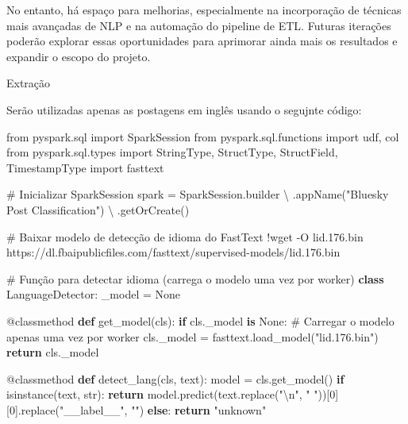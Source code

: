 \documentclass[
  letterpaper,
  DIV=11,
  numbers=noendperiod]{scrartcl}
\newenvironment{Shaded}{\begin{snugshade}}{\end{snugshade}}
\newcommand{\AttributeTok}[1]{\textcolor[rgb]{0.40,0.45,0.13}{#1}}
\newcommand{\BuiltInTok}[1]{\textcolor[rgb]{0.00,0.23,0.31}{#1}}
\newcommand{\CharTok}[1]{\textcolor[rgb]{0.13,0.47,0.30}{#1}}
\newcommand{\CommentTok}[1]{\textcolor[rgb]{0.37,0.37,0.37}{#1}}
\newcommand{\ControlFlowTok}[1]{\textcolor[rgb]{0.00,0.23,0.31}{\textbf{#1}}}
\newcommand{\DecValTok}[1]{\textcolor[rgb]{0.68,0.00,0.00}{#1}}
\newcommand{\FloatTok}[1]{\textcolor[rgb]{0.68,0.00,0.00}{#1}}
\newcommand{\ImportTok}[1]{\textcolor[rgb]{0.00,0.46,0.62}{#1}}
\newcommand{\KeywordTok}[1]{\textcolor[rgb]{0.00,0.23,0.31}{\textbf{#1}}}
\newcommand{\NormalTok}[1]{\textcolor[rgb]{0.00,0.23,0.31}{#1}}
\newcommand{\OperatorTok}[1]{\textcolor[rgb]{0.37,0.37,0.37}{#1}}
\newcommand{\StringTok}[1]{\textcolor[rgb]{0.13,0.47,0.30}{#1}}
\newcommand{\VariableTok}[1]{\textcolor[rgb]{0.07,0.07,0.07}{#1}}
\begin{document}
No entanto, há espaço para melhorias, especialmente na incorporação de
técnicas mais avançadas de NLP e na automação do pipeline de ETL.
Futuras iterações poderão explorar essas oportunidades para aprimorar
ainda mais os resultados e expandir o escopo do projeto.

Extração

Serão utilizadas apenas as postagens em inglês usando o segujnte código:

\begin{Shaded}
\begin{Highlighting}[]
\ImportTok{from}\NormalTok{ pyspark.sql }\ImportTok{import}\NormalTok{ SparkSession}
\ImportTok{from}\NormalTok{ pyspark.sql.functions }\ImportTok{import}\NormalTok{ udf, col}
\ImportTok{from}\NormalTok{ pyspark.sql.types }\ImportTok{import}\NormalTok{ StringType, StructType, StructField, TimestampType}
\ImportTok{import}\NormalTok{ fasttext}

\CommentTok{\# Inicializar SparkSession}
\NormalTok{spark }\OperatorTok{=}\NormalTok{ SparkSession.builder }\OperatorTok{\textbackslash{}}
\NormalTok{    .appName(}\StringTok{"Bluesky Post Classification"}\NormalTok{) }\OperatorTok{\textbackslash{}}
\NormalTok{    .getOrCreate()}

\CommentTok{\# Baixar modelo de detecção de idioma do FastText}
\OperatorTok{!}\NormalTok{wget }\OperatorTok{{-}}\NormalTok{O lid}\FloatTok{.176}\NormalTok{.}\BuiltInTok{bin}\NormalTok{ https:}\OperatorTok{//}\NormalTok{dl.fbaipublicfiles.com}\OperatorTok{/}\NormalTok{fasttext}\OperatorTok{/}\NormalTok{supervised}\OperatorTok{{-}}\NormalTok{models}\OperatorTok{/}\NormalTok{lid}\FloatTok{.176}\NormalTok{.}\BuiltInTok{bin}

\CommentTok{\# Função para detectar idioma (carrega o modelo uma vez por worker)}
\KeywordTok{class}\NormalTok{ LanguageDetector:}
\NormalTok{    \_model }\OperatorTok{=} \VariableTok{None}

    \AttributeTok{@classmethod}
    \KeywordTok{def}\NormalTok{ get\_model(cls):}
        \ControlFlowTok{if}\NormalTok{ cls.\_model }\KeywordTok{is} \VariableTok{None}\NormalTok{:}
            \CommentTok{\# Carregar o modelo apenas uma vez por worker}
\NormalTok{            cls.\_model }\OperatorTok{=}\NormalTok{ fasttext.load\_model(}\StringTok{"lid.176.bin"}\NormalTok{)}
        \ControlFlowTok{return}\NormalTok{ cls.\_model}

    \AttributeTok{@classmethod}
    \KeywordTok{def}\NormalTok{ detect\_lang(cls, text):}
\NormalTok{        model }\OperatorTok{=}\NormalTok{ cls.get\_model()}
        \ControlFlowTok{if} \BuiltInTok{isinstance}\NormalTok{(text, }\BuiltInTok{str}\NormalTok{):}
            \ControlFlowTok{return}\NormalTok{ model.predict(text.replace(}\StringTok{"}\CharTok{\textbackslash{}n}\StringTok{"}\NormalTok{, }\StringTok{" "}\NormalTok{))[}\DecValTok{0}\NormalTok{][}\DecValTok{0}\NormalTok{].replace(}\StringTok{"\_\_label\_\_"}\NormalTok{, }\StringTok{""}\NormalTok{)}
        \ControlFlowTok{else}\NormalTok{:}
            \ControlFlowTok{return} \StringTok{"unknown"}


\end{Highlighting}
\end{Shaded}
\end{document}
